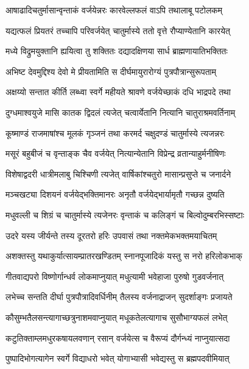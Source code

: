 \twolineshloka
{आषाढादिचतुर्मासान्वृन्ताकं वर्जयेन्नरः}
{कारवेल्लफलं वाऽपि तथालाबू पटोलकम्} %

\twolineshloka
{यद्यत्फलं प्रियतरं तच्चापि परिवर्जयेत्}
{चातुर्मास्ये ततो वृत्ते रौप्याण्येतानि कारयेत्} %

\twolineshloka
{मध्ये विद्रुमयुक्तानि ह्ययित्वा तु शक्तितः}
{दद्यादक्षिणया सार्ध ब्राह्मणायातिभक्तितः} %

\twolineshloka
{अभिष्ट देवमुद्दिश्य देवो मे प्रीयतामिति}
{स दीर्घमायुरारोग्यं पुत्रपौत्रान्सुरूपताम्} %

\twolineshloka
{अक्षय्यो सन्तात कीर्ति लब्ध्वा स्वर्गे महीयते}
{श्रावणे वर्जयेच्छाकं दधि भाद्रपदे तथा} %

\twolineshloka
{दुग्धमाश्वयुजे मासि कातक द्विदलं त्यजेत्}
{चत्वार्येतानि नित्यानि चातुराश्रमवर्तिनाम्} %

\twolineshloka
{कूष्माण्डं राजमाषांश्च मूलकं गृञ्जनं तथा}
{करमर्द चक्षुदण्डं चातुर्मास्ये त्यजन्नरः} %

\twolineshloka
{मसूरं बहुबीजं च वृन्ताङ्क चैव वर्जयेत्}
{नित्यान्येतानि विप्रेन्द्र व्रतान्याहुर्मनीषिणः} %

\twolineshloka
{विशेषाद्वदरी धात्रीमलाबु चिश्चिणी त्यजेत्}
{वार्षिकांश्चतुरो मासान्प्रसुप्ते च जनार्दने} %

\twolineshloka
{मञ्चखट्या दिशयनं वर्जयेद्भक्तिमानरः}
{अनृतौ वर्जयेद्भार्यामृतौ गच्छन्न दुष्यति} %

\twolineshloka
{मधुवल्ली च शिग्रं च चातुर्मास्ये त्यजेनरः}
{वृन्ताकं च कलिङ्गं च बिल्वोदुम्बरभिस्सष्टाः} %

\twolineshloka
{उदरे यस्य जीर्यन्ते तस्य दूरतरो हरिः}
{उपवासं तथा नक्तमेकभक्तमयाचितम्} %

\twolineshloka
{अशक्तस्तु यथाकुर्यात्सायम्प्रातरखण्डितम्}
{स्नानपूजादिकं यस्तु स नरो हरिलोकभाक्} %

\twolineshloka
{गीतवाद्यपरो विष्णोर्गान्धर्व लोकमाप्नुयात्}
{मधुत्यामी भवेहाजा पुरुषो गुडवर्जनात्} %

\twolineshloka
{लभेच्च सन्तति दीर्घा पुत्रपौत्रादिवर्धिनीम्}
{तैलस्य वर्जनाद्राजन् सुदर्शाङ्गः प्रजायते} %

\twolineshloka
{कौसुम्भतैलसन्त्यागाच्छत्रुनाशमवाप्नुयात्}
{मधूकतेलत्यागाच सुसौभाग्यफलं लभेत्} %

\twolineshloka
{कटुतिक्ताम्लमधुरकषायलवणान् रसान्}
{वर्जयेत्स च वैरूप्यं दौर्गन्ध्यं नाप्नुयात्सदा} %

\twolineshloka
{पुष्पादिभोगत्यागेन स्वर्गे विद्याधरो भवेत्}
{योगाभ्यासी भवेद्यस्तु स ब्रह्मपदवीमियात्} %


